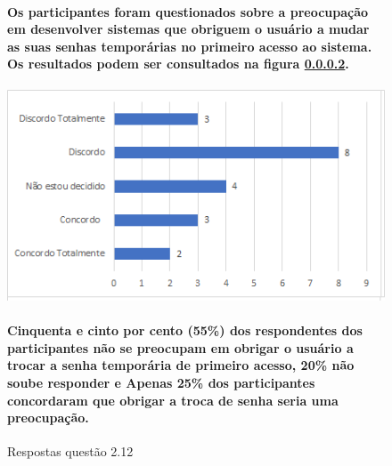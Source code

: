 \begin{figure}[!t]
\centering
\paragraph{Os participantes foram questionados sobre a preocupação em desenvolver sistemas que obriguem o usuário a mudar as suas senhas temporárias no primeiro acesso ao sistema. Os resultados podem ser consultados na figura \ref{fig:2.12}. }
\includegraphics[scale=0.7]{figuras das questoes/2.12.png}
\caption{Respostas questão 2.12}
\paragraph{
Cinquenta e cinto por cento (55{\%}) dos respondentes dos participantes não se preocupam em obrigar o usuário a trocar a senha temporária de primeiro acesso, 20{\%} não soube responder e Apenas 25{\%} dos participantes concordaram que obrigar a troca de senha seria uma preocupação. 
}

\label{fig:2.12}
\end{figure}


